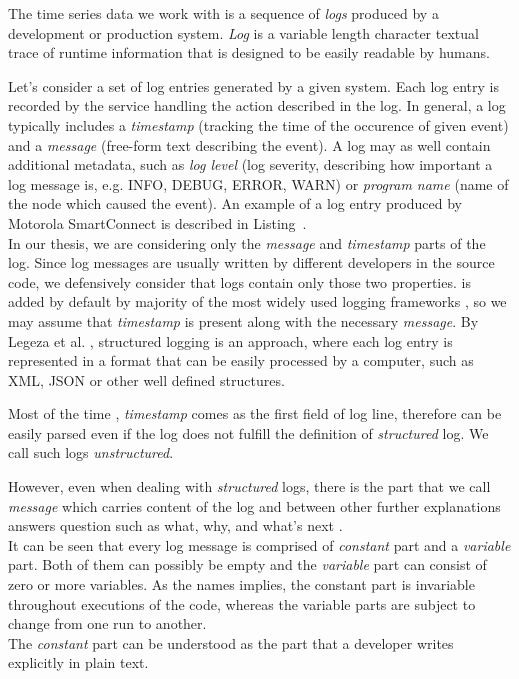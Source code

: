 The time series data we work with is a sequence of \textit{logs} produced by a development or production system. 
\textit{Log} is a variable length character textual trace of runtime information that is designed to be easily readable by humans.

Let's consider a set of log entries generated by a given system. Each log entry is recorded by the service handling the action described in the log. In general, a log typically includes a \textit{timestamp} (tracking the time of the occurence of given event) and a \textit{message} (free-form text describing the event). A log may as well contain additional metadata, such as \textit{log level} (log severity, describing how important a log message is, e.g. INFO, DEBUG, ERROR, WARN) or \textit{program name} (name of the node which caused the event). An example of a log entry produced by Motorola SmartConnect is described in Listing~.\\

In our thesis, we are considering only the \textit{message} and \textit{timestamp} parts of the log. Since log messages are usually written by different developers in the source code, we defensively consider that logs contain only those two properties.  is added by default by majority of the most widely used logging frameworks \cite{log4j:example} \cite{serilog:example} \cite{python_log:example}, so we may assume that \textit{timestamp} is present along with the necessary \textit{message}.
By Legeza et al. \cite{structured_logging}, structured logging is an approach, where each log entry is represented in a format that can be easily processed by a computer, such as XML, JSON or other well defined structures.

Most of the time \cite{log4j:example} \cite{serilog:example} \cite{python_log:example}, \textit{timestamp} comes as the first field of log line, therefore can be easily parsed even if the log does not fulfill the definition of \textit{structured} log. We call such logs \textit{unstructured}.

However, even when dealing with \textit{structured} logs, there is the part that we call \textit{message} which carries content of the log and between other further explanations answers question such as what, why, and what's next \cite{structured_logging}.\\

It can be seen that every log message is comprised of \textit{constant} part and a \textit{variable} part. Both of them can possibly be empty and the \textit{variable} part can consist of zero or more variables.
As the names implies, the constant part is invariable throughout executions of the code, whereas the variable parts are subject to change from one run to another.\\
The \textit{constant} part can be understood as the part that a developer writes explicitly in plain text.\\

